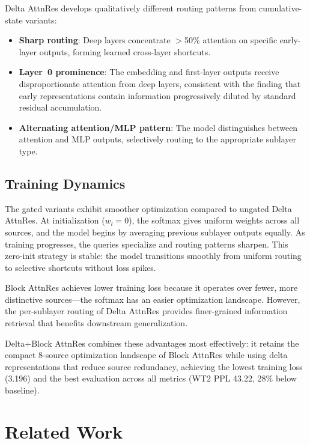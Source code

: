 \documentclass{article}
\begin{document}
Delta AttnRes develops qualitatively different routing patterns from cumulative-state variants:
\begin{itemize}
    \item \textbf{Sharp routing}: Deep layers concentrate $>$50\% attention on specific early-layer outputs, forming learned cross-layer shortcuts.
    \item \textbf{Layer~0 prominence}: The embedding and first-layer outputs receive disproportionate attention from deep layers, consistent with the finding that early representations contain information progressively diluted by standard residual accumulation.
    \item \textbf{Alternating attention/MLP pattern}: The model distinguishes between attention and MLP outputs, selectively routing to the appropriate sublayer type.
\end{itemize}

\subsection{Training Dynamics}

The gated variants exhibit smoother optimization compared to ungated Delta AttnRes. At initialization ($w_l = 0$), the softmax gives uniform weights across all sources, and the model begins by averaging previous sublayer outputs equally. As training progresses, the queries specialize and routing patterns sharpen. This zero-init strategy is stable: the model transitions smoothly from uniform routing to selective shortcuts without loss spikes.

Block AttnRes achieves lower training loss because it operates over fewer, more distinctive sources---the softmax has an easier optimization landscape. However, the per-sublayer routing of Delta AttnRes provides finer-grained information retrieval that benefits downstream generalization.

Delta+Block AttnRes combines these advantages most effectively: it retains the compact 8-source optimization landscape of Block AttnRes while using delta representations that reduce source redundancy, achieving the lowest training loss (3.196) and the best evaluation across all metrics (WT2 PPL 43.22, 28\% below baseline).

\section{Related Work}
\end{document}

